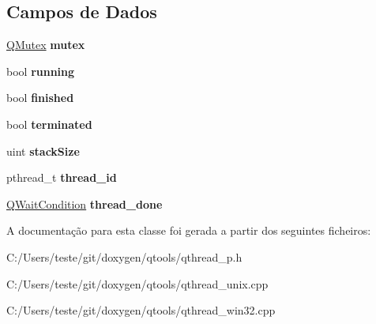 \subsection*{Campos de Dados}
\begin{DoxyCompactItemize}
\item 
\hypertarget{class_q_thread_private_af6f9da7af5126b3f589fc5ff8b002335}{\hyperlink{class_q_mutex}{Q\-Mutex} {\bfseries mutex}}\label{class_q_thread_private_af6f9da7af5126b3f589fc5ff8b002335}

\item 
\hypertarget{class_q_thread_private_a36f7b6be7108281af77939ceaec42fd6}{bool {\bfseries running}}\label{class_q_thread_private_a36f7b6be7108281af77939ceaec42fd6}

\item 
\hypertarget{class_q_thread_private_a9324389a5cdc532c6417a87ccafe18ce}{bool {\bfseries finished}}\label{class_q_thread_private_a9324389a5cdc532c6417a87ccafe18ce}

\item 
\hypertarget{class_q_thread_private_ad1aea42fae01ba0d2917114d189a9d36}{bool {\bfseries terminated}}\label{class_q_thread_private_ad1aea42fae01ba0d2917114d189a9d36}

\item 
\hypertarget{class_q_thread_private_a61e4736be0ce3ece9b75fca644dc29c7}{uint {\bfseries stack\-Size}}\label{class_q_thread_private_a61e4736be0ce3ece9b75fca644dc29c7}

\item 
\hypertarget{class_q_thread_private_a614409619094fd8c0c6b522c400ffeea}{pthread\-\_\-t {\bfseries thread\-\_\-id}}\label{class_q_thread_private_a614409619094fd8c0c6b522c400ffeea}

\item 
\hypertarget{class_q_thread_private_ae748cf2d34a01bcad8e59507839533f0}{\hyperlink{class_q_wait_condition}{Q\-Wait\-Condition} {\bfseries thread\-\_\-done}}\label{class_q_thread_private_ae748cf2d34a01bcad8e59507839533f0}

\end{DoxyCompactItemize}


A documentação para esta classe foi gerada a partir dos seguintes ficheiros\-:\begin{DoxyCompactItemize}
\item 
C\-:/\-Users/teste/git/doxygen/qtools/qthread\-\_\-p.\-h\item 
C\-:/\-Users/teste/git/doxygen/qtools/qthread\-\_\-unix.\-cpp\item 
C\-:/\-Users/teste/git/doxygen/qtools/qthread\-\_\-win32.\-cpp\end{DoxyCompactItemize}
